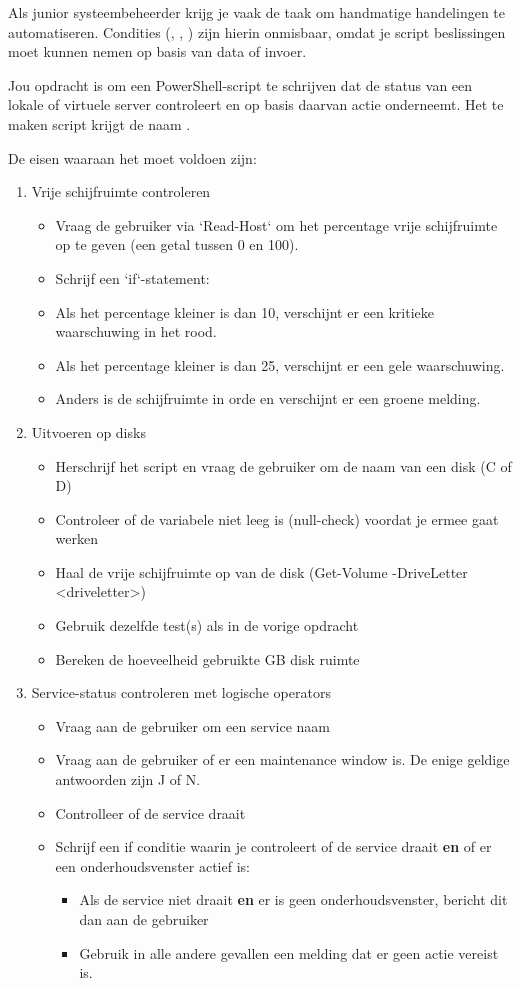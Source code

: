 
Als junior systeembeheerder krijg je vaak de taak om handmatige handelingen te automatiseren. Condities (, , ) zijn hierin onmisbaar, omdat je script beslissingen moet kunnen nemen op basis van data of invoer.

Jou opdracht is om een PowerShell-script te schrijven dat de status van een lokale of virtuele server controleert en op basis daarvan actie onderneemt. Het te maken script krijgt de naam .

De eisen waaraan het moet voldoen zijn:
\begin{enumerate}
\item Vrije schijfruimte controleren
	\begin{itemize}
	\item Vraag de gebruiker via `Read-Host` om het percentage vrije schijfruimte op te geven (een getal tussen 0 en 100).
	\item Schrijf een `if`-statement:
	\item Als het percentage kleiner is dan 10, verschijnt er een kritieke waarschuwing in het rood.
	\item Als het percentage kleiner is dan 25, verschijnt er een gele waarschuwing.
	\item Anders is de schijfruimte in orde en verschijnt er een groene melding.
	\end{itemize}
\item Uitvoeren op disks
	\begin{itemize}
	\item Herschrijf het script en vraag de gebruiker om de naam van een disk (C of D)
	\item Controleer of de variabele niet leeg is (null-check) voordat je ermee gaat werken
	\item Haal de vrije schijfruimte op van de disk (Get-Volume -DriveLetter <driveletter>)
	\item Gebruik dezelfde test(s) als in de vorige opdracht
	\item Bereken de hoeveelheid gebruikte GB disk ruimte
	\end{itemize}
\item Service-status controleren met logische operators
	\begin{itemize}
	\item Vraag aan de gebruiker om een service naam
	\item Vraag aan de gebruiker of er een maintenance window is. De enige geldige antwoorden zijn J of N.
	\item Controlleer of de service draait
	\item Schrijf een if conditie waarin je controleert of de service draait \textbf{en} of er een onderhoudsvenster actief is:
		\begin{itemize}
		\item Als de service niet draait \textbf{en} er is geen onderhoudsvenster, bericht dit dan aan de gebruiker
		\item Gebruik in alle andere gevallen een melding dat er geen actie vereist is.
		\end{itemize}
	\end{itemize}
\end{enumerate}

